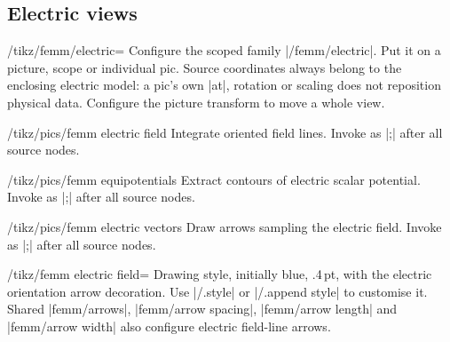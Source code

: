 \begin{codeexample}[width=0pt]
\end{codeexample}

\subsection{Electric views}
\label{sec:electric-view}
\begin{key}{/tikz/femm/electric=}
Configure the scoped family |/femm/electric|. Put it on a picture, scope or
individual pic. Source coordinates always belong to the enclosing electric
model: a pic's own |at|, rotation or scaling does not reposition physical data.
Configure the picture transform to move a whole view.
\end{key}

\begin{key}{/tikz/pics/femm electric field}
Integrate oriented field lines. Invoke as |;| after all source nodes.
\end{key}

\begin{key}{/tikz/pics/femm equipotentials}
Extract contours of electric scalar potential. Invoke as |;| after all source nodes.
\end{key}

\begin{key}{/tikz/pics/femm electric vectors}
Draw arrows sampling the electric field. Invoke as |;| after all source nodes.
\end{key}

\begin{key}{/tikz/femm electric field=}
Drawing style, initially blue, .4\,pt, with the electric orientation arrow decoration. Use |/.style| or |/.append style| to customise it.
Shared |femm/arrows|, |femm/arrow spacing|, |femm/arrow length| and
|femm/arrow width| also configure electric field-line arrows.
\end{key}

